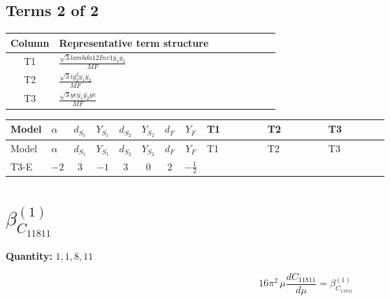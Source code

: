 \documentclass[8pt]{article}
\begin{document}
\begin{landscape}
\subsection*{Terms 2 of 2}
\begin{center}
\begin{tabular}{@{}c >{\raggedright\arraybackslash}p{0.82\linewidth}@{}}
\toprule
Column & Representative term structure \\
\midrule
T1 & \(\displaystyle \frac{\sqrt{3} lambda12Inv1 \overline{y_{1}} \overline{y_{2}}}{MF}\) \\
\midrule
T2 & \(\displaystyle \frac{\sqrt{3} i g_{2}^{2} \overline{y_{1}} \overline{y_{2}}}{MF}\) \\
\midrule
T3 & \(\displaystyle \frac{\sqrt{3} ye \overline{y_{1}} \overline{y_{2}} \overline{ye}}{MF}\) \\
\midrule
\bottomrule
\end{tabular}
\end{center}
\smallskip
\tiny
\begin{longtable}{@{}llcccccc >{\raggedright\arraybackslash}p{0.21\linewidth} >{\raggedright\arraybackslash}p{0.21\linewidth} >{\raggedright\arraybackslash}p{0.21\linewidth}@{}}
\toprule
Model & $\alpha$ & $d_{S_1}$ & $Y_{S_1}$ & $d_{S_2}$ & $Y_{S_2}$ & $d_F$ & $Y_F$ & T1 & T2 & T3 \\
\midrule
\endfirsthead
\toprule
Model & $\alpha$ & $d_{S_1}$ & $Y_{S_1}$ & $d_{S_2}$ & $Y_{S_2}$ & $d_F$ & $Y_F$ & T1 & T2 & T3 \\
\midrule
\endhead
T3-E & $-2$ & $3$ & $-1$ & $3$ & $0$ & $2$ & $-\frac{1}{2}$ & \scriptsize\adjustbox{max width=\linewidth}{$\begin{gathered} \frac{\sqrt{3} lambda12Inv1 \overline{y_{1}} \overline{y_{2}}}{6 MF}\end{gathered}$} & \scriptsize\adjustbox{max width=\linewidth}{$\begin{gathered} \frac{\sqrt{3} i g_{2}^{2} \overline{y_{1}} \overline{y_{2}}}{6 MF}\end{gathered}$} & \scriptsize\adjustbox{max width=\linewidth}{$\begin{gathered} \frac{\sqrt{3} ye \overline{y_{1}} \overline{y_{2}} \overline{ye}}{12 MF}\end{gathered}$} \\
\midrule
\bottomrule
\end{longtable}
\clearpage
\section*{$\beta_{C_{11811}}^{(1)}$}
\noindent\textbf{Quantity: }$\mathrm{1,1,8,11}$\par\smallskip
\[16\pi^2\,\mu\frac{d C_{11811}}{d\mu}=\beta_{C_{11811}}^{(1)}\]

\end{landscape}
\end{document}
